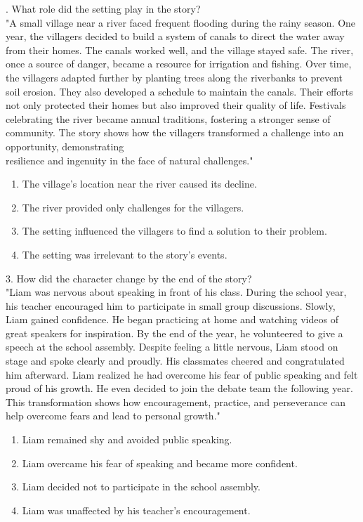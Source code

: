\documentclass[12pt]{article}
\begin{document}
\vspace{1cm}
. What role did the setting play in the story?\\
"A small village near a river faced frequent flooding during the rainy season. One year, the villagers decided to build a system of canals to direct the water away from their homes. The canals worked well, and the village stayed safe. The river, once a source of danger, became a resource for irrigation and fishing. Over time, the villagers adapted further by planting trees along the riverbanks to prevent soil erosion. They also developed a schedule to maintain the canals. Their efforts not only protected their homes but also improved their quality of life. Festivals celebrating the river became annual traditions, fostering a stronger sense of community. The story shows how the villagers transformed a challenge into an opportunity, demonstrating \\resilience and ingenuity in the face of natural challenges."\\
\begin{enumerate}[label=\Alph*.]
    \item The village’s location near the river caused its decline.  
    \item The river provided only challenges for the villagers.  
    \item The setting influenced the villagers to find a solution to their problem.  
    \item The setting was irrelevant to the story’s events.  
\end{enumerate}

\vspace{1cm}

3. How did the character change by the end of the story?\\
"Liam was nervous about speaking in front of his class. During the school year, his teacher encouraged him to participate in small group discussions. Slowly, Liam gained confidence. He began practicing at home and watching videos of great speakers for inspiration. By the end of the year, he volunteered to give a speech at the school assembly. Despite feeling a little nervous, Liam stood on stage and spoke clearly and proudly. His classmates cheered and congratulated him afterward. Liam realized he had overcome his fear of public speaking and felt proud of his growth. He even decided to join the debate team the following year. This transformation shows how encouragement, practice, and perseverance can help overcome fears and lead to personal growth."\\
\begin{enumerate}[label=\Alph*.]
    \item Liam remained shy and avoided public speaking.  
    \item Liam overcame his fear of speaking and became more confident.  
    \item Liam decided not to participate in the school assembly.  
    \item Liam was unaffected by his teacher’s encouragement.  
\end{enumerate}
\end{document}
